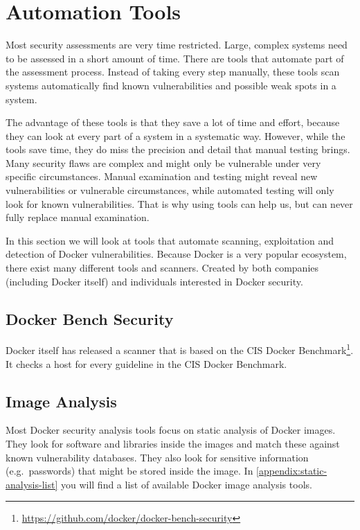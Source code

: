 \section{Automation Tools}\label{section:tools}
Most security assessments are very time restricted. Large, complex systems need to be assessed in a short amount of time. There are tools that automate part of the assessment process. Instead of taking every step manually, these tools scan systems automatically find known vulnerabilities and possible weak spots in a system.

The advantage of these tools is that they save a lot of time and effort, because they can look at every part of a system in a systematic way. However, while the tools save time, they do miss the precision and detail that manual testing brings. Many security flaws are complex and might only be vulnerable under very specific circumstances. Manual examination and testing might reveal new vulnerabilities or vulnerable circumstances, while automated testing will only look for known vulnerabilities. That is why using tools can help us, but can never fully replace manual examination.

\hfill

In this section we will look at tools that automate scanning, exploitation and detection of Docker vulnerabilities. Because Docker is a very popular ecosystem, there exist many different tools and scanners. Created by both companies (including Docker itself) and individuals interested in Docker security.

\subsection{Docker Bench Security}
Docker itself has released a scanner that is based on the CIS Docker Benchmark\footnote{\url{https://github.com/docker/docker-bench-security}}. It checks a host for every guideline in the CIS Docker Benchmark.

\subsection{Image Analysis}\label{subsection:image-analysis-tools}
Most Docker security analysis tools focus on static analysis of Docker images. They look for software and libraries inside the images and match these against known vulnerability databases. They also look for sensitive information (e.g.\ passwords) that might be stored inside the image. In \autoref{appendix:static-analysis-list} you will find a list of available Docker image analysis tools.

